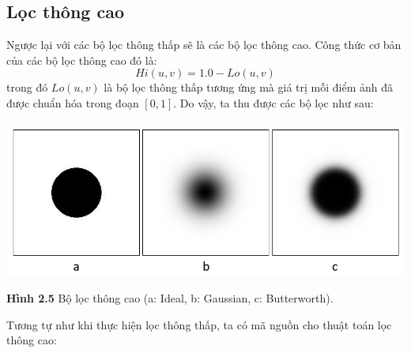\subsection{Lọc thông cao}
Ngược lại với các bộ lọc thông thấp sẽ là các bộ lọc thông cao. Công thức cơ bản của các bộ lọc thông cao đó là:
$$Hi(u, v) = 1.0 - Lo(u, v)$$
trong đó $Lo(u,v)$ là bộ lọc thông thấp tương ứng mà giá trị mỗi điểm ảnh đã được chuẩn hóa trong đoạn $[0,1]$. Do vậy, ta thu được các bộ lọc như sau:
\begin{center}
    \includegraphics[scale=0.55]{Figures/fig9.png}
    \par \textbf {Hình 2.5} Bộ lọc thông cao (a: Ideal, b: Gaussian, c: Butterworth).
\end{center}
Tương tự như khi thực hiện lọc thông thấp, ta có mã nguồn cho thuật toán lọc thông cao:

